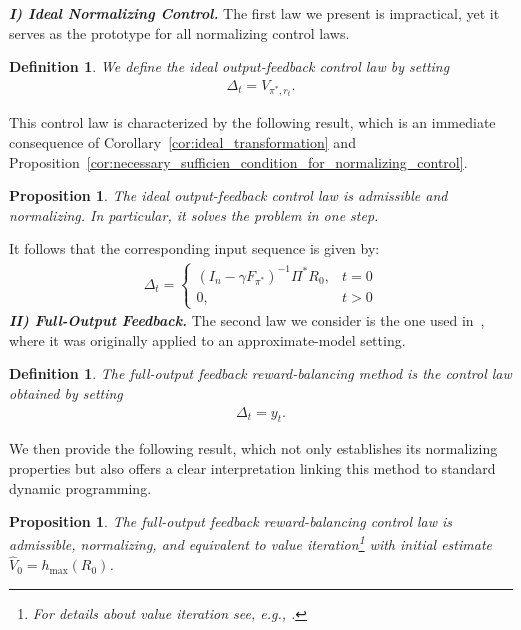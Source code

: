 \documentclass[10pt,leqno]{amsart}
\newcommand{\sml}{\scriptscriptstyle}
\newcommand{\cost}{r}
\newcommand{\Vsym}{V}
\newcommand{\Varg}[1]{\Vsym_{#1}}
\newcommand{\Cost}{R}
\newcommand{\F}{F}
\newcommand{\Ffb}[1]{\F_{#1}}
\newcommand{\policy}{\pi}
\newcommand{\disc}{\gamma}
\newcommand{\outmap}{h_{\sml \text{max}}}
\newtheorem{definition}[theorem]{Definition}
\newtheorem{proposition}[theorem]{Proposition}
\begin{document}
\newline
\noindent\textbf{\emph{I) Ideal Normalizing Control.}}
\newline
The first law we present is impractical, yet it serves as the prototype for all normalizing control laws.
\begin{definition}\label{def:ideal_output_feedback}
    We define the ideal output-feedback control law by setting
    \begin{align}
        \Delta_t = \Varg{\policy^*\!, \cost_t}.
    \end{align}
\end{definition}
\noindent This control law is characterized by the following result, which is an immediate consequence of Corollary~\ref{cor:ideal_transformation} and Proposition~\ref{cor:necessary_sufficien_condition_for_normalizing_control}.
\begin{proposition}
    The ideal output-feedback control law is admissible and normalizing. In particular, it solves the problem in one step.
\end{proposition}
\noindent It follows that the corresponding input sequence is given by:
\begin{align}\label{eq:ideal_input_sequence}
    \Delta_t = 
    \begin{cases}
        (I_n - \disc \Ffb{\policy^*})^{-1} \Pi^* \Cost_0, & t = 0\\
        0, & t > 0
    \end{cases}
\end{align}
\noindent\textbf{\emph{II) Full-Output Feedback.}}
\newline
The second law we consider is the one used in~\cite[Algorithm 2]{mustafin2025mdpgeometrynormalizationreward}, where it was originally applied to an approximate-model setting.
\begin{definition}\label{def:MFRBS}
    The full-output feedback reward-balancing method is the control law obtained by setting
    \begin{align}
        \Delta_t = y_t.
    \end{align}
\end{definition}
\noindent We then provide the following result, which not only establishes its normalizing properties but also offers a clear interpretation linking this method to standard dynamic programming.
\begin{proposition}
    The full-output feedback reward-balancing control law is admissible, normalizing, and equivalent to value iteration\footnote{For details about value iteration see, e.g., \cite[Chapter 6.3]{puterman2014markov}.} with initial estimate $\hat{V}_0 = \outmap(\Cost_0)$.
\end{proposition}
\end{document}
